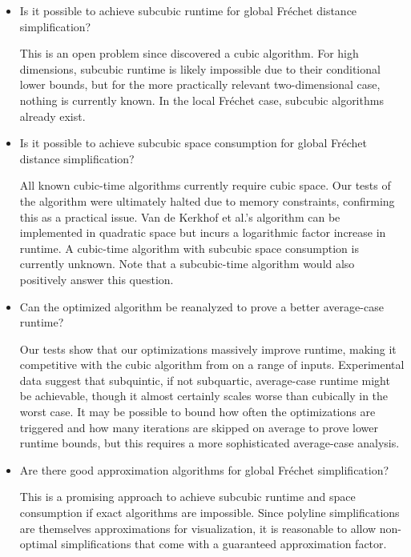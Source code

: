 \begin{itemize}
  \item Is it possible to achieve subcubic runtime for global Fréchet distance simplification?

	This is an open problem since \citeauthor{polyline_simplification_has_cubic_complexity_bringmannetal} discovered a cubic algorithm. For high dimensions, subcubic runtime is likely impossible due to their conditional lower bounds, but for the more practically relevant two-dimensional case, nothing is currently known. In the local Fréchet case, subcubic algorithms already exist.

	\item Is it possible to achieve subcubic space consumption for global Fréchet distance simplification?

	All known cubic-time algorithms currently require cubic space. Our tests of the \citeauthor{polyline_simplification_has_cubic_complexity_bringmannetal} algorithm were ultimately halted due to memory constraints, confirming this as a practical issue. Van de Kerkhof et al.'s algorithm can be implemented in quadratic space but incurs a logarithmic factor increase in runtime. A cubic-time algorithm with subcubic space consumption is currently unknown. Note that a subcubic-time algorithm would also positively answer this question.

	\item Can the optimized \citeauthor{on_optimal_polyline_simplification_using_the_hausdorff_and_frechet_distance} algorithm be reanalyzed to prove a better average-case runtime?

	Our tests show that our optimizations massively improve runtime, making it competitive with the cubic algorithm from \citeauthor{polyline_simplification_has_cubic_complexity_bringmannetal} on a range of inputs. Experimental data suggest that subquintic, if not subquartic, average-case runtime might be achievable, though it almost certainly scales worse than cubically in the worst case. It may be possible to bound how often the optimizations are triggered and how many iterations are skipped on average to prove lower runtime bounds, but this requires a more sophisticated average-case analysis.

	\item Are there good approximation algorithms for global Fréchet simplification?

	This is a promising approach to achieve subcubic runtime and space consumption if exact algorithms are impossible. Since polyline simplifications are themselves approximations for visualization, it is reasonable to allow non-optimal simplifications that come with a guaranteed approximation factor.


\end{itemize}
